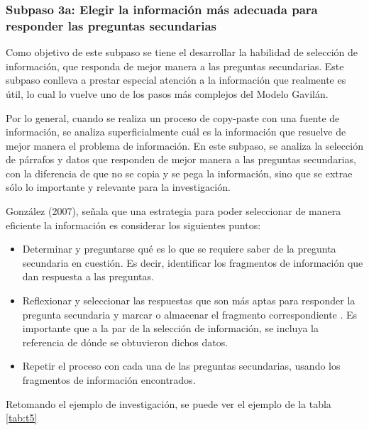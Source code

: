
\subsubsection{Subpaso 3a: Elegir la información más adecuada para responder las preguntas secundarias}
\label{secPaso3aCap2}

Como objetivo de este subpaso se tiene el desarrollar la habilidad de selección de información, que responda de mejor manera a las preguntas secundarias. Este subpaso conlleva a prestar especial atención a la información que realmente es útil, lo cual lo vuelve uno de los pasos más complejos del Modelo Gavilán.

Por lo general, cuando se realiza un proceso de copy-paste con una fuente de información, se analiza superficialmente cuál es la información que resuelve de mejor manera el problema de información. En este subpaso, se analiza la selección de párrafos y datos que responden de mejor manera a las preguntas secundarias, con la diferencia de que no se copia y se pega la información, sino que se extrae sólo lo importante y relevante para la investigación.

González (2007), señala que una estrategia para poder seleccionar de manera eficiente la información es considerar los siguientes puntos:

\begin{itemize}
  \item Determinar y preguntarse qué es lo que se requiere saber de la pregunta secundaria en cuestión. Es decir, identificar los fragmentos de información que dan respuesta a las preguntas.
  \item Reflexionar y seleccionar las respuestas que son más aptas para responder la pregunta secundaria y marcar o almacenar el fragmento correspondiente . Es importante que a la par de la selección de información, se incluya la referencia de dónde se obtuvieron dichos datos.
  \item Repetir el proceso con cada una de las preguntas secundarias, usando los fragmentos de información encontrados.
\end{itemize}

Retomando el ejemplo de investigación, se puede ver el ejemplo de la tabla \ref{tab:t5}

